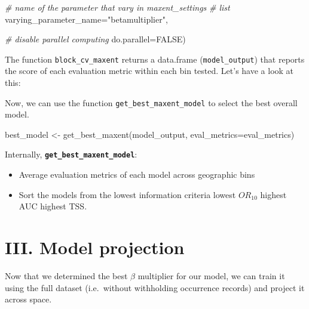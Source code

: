 \documentclass[
]{article}
\newenvironment{Shaded}{\begin{snugshade}}{\end{snugshade}}
\newcommand{\AttributeTok}[1]{\textcolor[rgb]{0.77,0.63,0.00}{#1}}
\newcommand{\CommentTok}[1]{\textcolor[rgb]{0.56,0.35,0.01}{\textit{#1}}}
\newcommand{\ConstantTok}[1]{\textcolor[rgb]{0.00,0.00,0.00}{#1}}
\newcommand{\FunctionTok}[1]{\textcolor[rgb]{0.00,0.00,0.00}{#1}}
\newcommand{\NormalTok}[1]{#1}
\newcommand{\OtherTok}[1]{\textcolor[rgb]{0.56,0.35,0.01}{#1}}
\newcommand{\StringTok}[1]{\textcolor[rgb]{0.31,0.60,0.02}{#1}}
\begin{document}
\begin{Shaded}
\begin{Highlighting}[]
                            \CommentTok{\# name of the parameter that vary in maxent\_settings}
                            \CommentTok{\# list}
                            \AttributeTok{varying\_parameter\_name=}\StringTok{"betamultiplier"}\NormalTok{,}

                            \CommentTok{\# disable parallel computing}
                            \AttributeTok{do.parallel=}\ConstantTok{FALSE}\NormalTok{)}
\end{Highlighting}
\end{Shaded}

The function \texttt{block\_cv\_maxent} returns a data.frame
(\texttt{model\_output}) that reports the score of each evaluation
metric within each bin tested. Let's have a look at this:

Now, we can use the function \texttt{get\_best\_maxent\_model} to select
the best overall model.

\begin{Shaded}
\begin{Highlighting}[]
\NormalTok{best\_model }\OtherTok{\textless{}{-}} \FunctionTok{get\_best\_maxent}\NormalTok{(model\_output, }\AttributeTok{eval\_metrics=}\NormalTok{eval\_metrics)}
\end{Highlighting}
\end{Shaded}

\begin{infobox}

Internally, \textbf{\texttt{get\_best\_maxent\_model}}:

\begin{itemize}
\item
  Average evaluation metrics of each model across geographic bins
\item
  Sort the models from the lowest information criteria
  \rightarrow lowest \(OR_{10}\) \rightarrow highest AUC
  \rightarrow highest TSS.
\end{itemize}

\end{infobox}

\hypertarget{iii.-model-projection}{%
\section{III. Model projection}\label{iii.-model-projection}}

Now that we determined the best \(\beta\) multiplier for our model, we
can train it using the full dataset (i.e.~without withholding occurrence
records) and project it across space.
\end{document}
